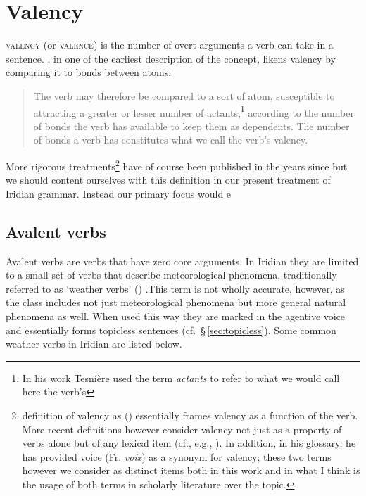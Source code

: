 \section{Valency}

{\scshape valency} (or {\scshape valence}) is the number of overt
arguments a verb can take in a sentence.
\textcite[239]{tesniere1965}, in one of the earliest description of the concept,
likens valency by comparing it to bonds between atoms:
\begin{quotation}
	\small
The verb may therefore be compared to a sort of atom, susceptible to attracting
a greater or lesser number of actants,\footnote{In his work Tesni\`ere used the
term \emph{actants} to refer to what we would call here the verb's
} according to the number of bonds the verb has available to
keep them as dependents. The number of bonds a verb has constitutes what we call
the verb's valency.
\end{quotation}

More rigorous treatments\footnote{ definition of valency
as 
()
essentially frames valency as a function of the verb. More recent definitions
however consider valency not just as a property of verbs alone but of any
lexical item (cf., e.g., \cite{matthews1997,trask1993}). In addition, in his
glossary, he has provided voice (Fr. \emph{voix}) as a synonym for valency;
these two terms however we consider as distinct items both in this work and in
what I think is the usage of both terms in scholarly literature over the topic.}
have of course been published in the years since but we should content ourselves
with this definition in our present treatment of Iridian grammar. Instead our
primary focus would e

\subsection{Avalent verbs}

Avalent verbs  are verbs that have zero core arguments. In
Iridian they are limited to a small set of verbs that describe meteorological
phenomena, traditionally referred to as `weather verbs' ()
.This term is not wholly accurate, however, as the class
includes not just meteorological phenomena but more general natural phenomena as
well. When used this way they are marked in the agentive voice and essentially forms topicless sentences
(cf.~\S\,\ref{sec:topicless}). Some common weather verbs in Iridian are listed
below.

